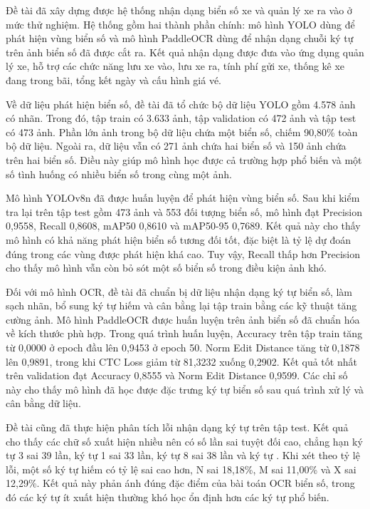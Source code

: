 \documentclass[13pt,a4paper]{report}
\begin{document}
Đề tài đã xây dựng được hệ thống nhận dạng biển số xe và quản lý xe ra vào ở mức thử nghiệm. Hệ thống gồm hai thành phần chính: mô hình YOLO dùng để phát hiện vùng biển số và mô hình PaddleOCR dùng để nhận dạng chuỗi ký tự trên ảnh biển số đã được cắt ra. Kết quả nhận dạng được đưa vào ứng dụng quản lý xe, hỗ trợ các chức năng lưu xe vào, lưu xe ra, tính phí gửi xe, thống kê xe đang trong bãi, tổng kết ngày và cấu hình giá vé.

Về dữ liệu phát hiện biển số, đề tài đã tổ chức bộ dữ liệu YOLO gồm 4.578 ảnh có nhãn. Trong đó, tập train có 3.633 ảnh, tập validation có 472 ảnh và tập test có 473 ảnh. Phần lớn ảnh trong bộ dữ liệu chứa một biển số, chiếm 90,80\% toàn bộ dữ liệu. Ngoài ra, dữ liệu vẫn có 271 ảnh chứa hai biển số và 150 ảnh chứa trên hai biển số. Điều này giúp mô hình học được cả trường hợp phổ biến và một số tình huống có nhiều biển số trong cùng một ảnh.

Mô hình YOLOv8n đã được huấn luyện để phát hiện vùng biển số. Sau khi kiểm tra lại trên tập test gồm 473 ảnh và 553 đối tượng biển số, mô hình đạt Precision 0,9558, Recall 0,8608, mAP50 0,8610 và mAP50-95 0,7689. Kết quả này cho thấy mô hình có khả năng phát hiện biển số tương đối tốt, đặc biệt là tỷ lệ dự đoán đúng trong các vùng được phát hiện khá cao. Tuy vậy, Recall thấp hơn Precision cho thấy mô hình vẫn còn bỏ sót một số biển số trong điều kiện ảnh khó.

Đối với mô hình OCR, đề tài đã chuẩn bị dữ liệu nhận dạng ký tự biển số, làm sạch nhãn, bổ sung ký tự hiếm và cân bằng lại tập train bằng các kỹ thuật tăng cường ảnh. Mô hình PaddleOCR được huấn luyện trên ảnh biển số đã chuẩn hóa về kích thước phù hợp. Trong quá trình huấn luyện, Accuracy trên tập train tăng từ 0,0000 ở epoch đầu lên 0,9453 ở epoch 50. Norm Edit Distance tăng từ 0,1878 lên 0,9891, trong khi CTC Loss giảm từ 81,3232 xuống 0,2902. Kết quả tốt nhất trên validation đạt Accuracy 0,8555 và Norm Edit Distance 0,9599. Các chỉ số này cho thấy mô hình đã học được đặc trưng ký tự biển số sau quá trình xử lý và cân bằng dữ liệu.

Đề tài cũng đã thực hiện phân tích lỗi nhận dạng ký tự trên tập test. Kết quả cho thấy các chữ số xuất hiện nhiều nên có số lần sai tuyệt đối cao, chẳng hạn ký tự 3 sai 39 lần, ký tự 1 sai 33 lần, ký tự 8 sai 38 lần và ký tự . Khi xét theo tỷ lệ lỗi, một số ký tự hiếm có tỷ lệ sai cao hơn, N sai 18,18\%, M sai 11,00\% và X sai 12,29\%. Kết quả này phản ánh đúng đặc điểm của bài toán OCR biển số, trong đó các ký tự ít xuất hiện thường khó học ổn định hơn các ký tự phổ biến.
\end{document}
